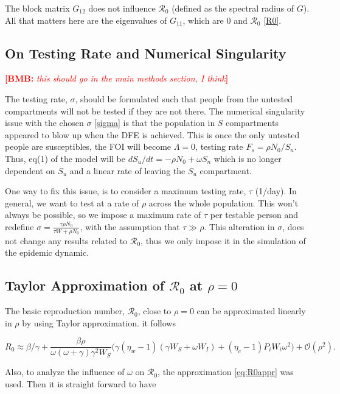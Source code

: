 \documentclass[12pt]{article}
\newcommand{\comment}{\showcomment}
\newcommand{\showcomment}[3]{\textcolor{#1}{\textbf{[#2: }\textsl{#3}\textbf{]}}}
\newcommand{\bmb}[1]{\comment{red}{BMB}{#1}}
\newcommand{\Rnum}{\mathcal{R}_0}
\theoremstyle{definition} %
\begin{document}
The block matrix $G_{12}$ does not influence $\Rnum$ (defined as the spectral radius of $G$). All that matters here are the eigenvalues of $G_{11}$, which are 0 and $\Rnum$ \eqref{R0}.

\subsection{On Testing Rate and Numerical Singularity}

\bmb{this should go in the main methods section, I think}

The testing rate, $\sigma$, should be formulated such that people from the untested compartments will not be tested if they are not there. The numerical singularity issue with the chosen $\sigma$ \eqref{sigma} is that the population in $S$ compartments appeared to blow up when the DFE is achieved. This is once the only untested people are susceptibles, the FOI will become $\Lambda=0$, testing rate $F_s=\rho N_0/S_u$. Thus, eq(1) of the model will be $d S_u/dt = - \rho N_0 + \omega S_n$ which is no longer dependent on $S_u$ and a linear rate of leaving the $S_u$ compartment.

One way to fix this issue, is to consider a maximum testing rate, $\tau$ (1/day). In general, we want to test at a rate of $\rho$ across the whole population. This won't always be possible, so we impose a maximum rate of $\tau$ per testable person and redefine $\sigma = \frac{\tau \rho N_0}{\tau W + \rho N_0}$, with the assumption that $\tau \gg \rho$. This alteration in $\sigma$, does not change any results related to $\Rnum$, thus we only impose it in the simulation of the epidemic dynamic.

\subsection{Taylor Approximation of $\Rnum$ at $\rho=0$ }

The basic reproduction number, $\Rnum$, close to $\rho=0$ can be approximated linearly in $\rho$ by using Taylor approximation. it follows

\begin{equation}
\label{eq:R0appr}
R_0 \approx \beta/\gamma + \frac{\beta \rho}{\omega (\omega+\gamma) \gamma^2 W_S} \Big(\gamma(\eta_w-1)(\gamma W_S+\omega W_I) + (\eta_c -1)P_iW_i \omega^2 \Big) + \mathcal{O}(\rho^2).
\end{equation}

Also, to analyze the influence of $\omega$ on $\Rnum$, the approximation \eqref{eq:R0appr} was used. Then it is straight forward to have
\end{document}
